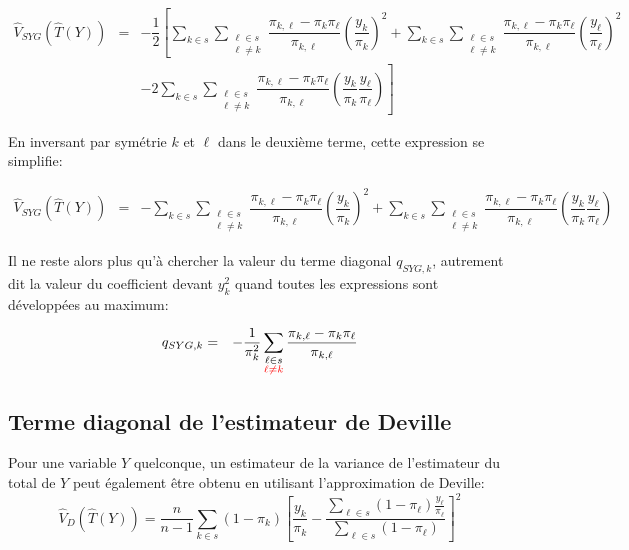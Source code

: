 \documentclass[a4paper,12pt]{article}
\begin{document}
\begin{eqnarray*}
\hat{V}_{SYG}(\hat{T}(Y)) &=& -\dfrac{1}{2} \left[ \sum \limits_{k \in s} \sum \limits_{\substack{\ell \in s \\ \ell \neq k}} \dfrac{\pi_{k,\ell} - \pi_k \pi_\ell}{\pi_{k,\ell}} \left(\dfrac{y_k}{\pi_k}\right)^2 + \sum \limits_{k \in s} \sum \limits_{\substack{\ell \in s \\ \ell \neq k}} \dfrac{\pi_{k,\ell} - \pi_k \pi_\ell}{\pi_{k,\ell}} \left(\dfrac{y_\ell}{\pi_\ell}\right)^2 \right. \\
&& \left. - 2 \sum \limits_{k \in s} \sum \limits_{\substack{\ell \in s \\ \ell \neq k}} \dfrac{\pi_{k,\ell} - \pi_k \pi_\ell}{\pi_{k,\ell}} \left( \dfrac{y_k}{\pi_k} \dfrac{y_\ell}{\pi_\ell}\right) \right]
\end{eqnarray*}

\bigskip En inversant par symétrie $k$ et $\ell$ dans le deuxième terme, cette expression se simplifie:

\begin{eqnarray*}
\hat{V}_{SYG}(\hat{T}(Y)) &=& - \sum \limits_{k \in s} \sum \limits_{\substack{\ell \in s \\ \ell \neq k}} \dfrac{\pi_{k,\ell} - \pi_k \pi_\ell}{\pi_{k,\ell}} \left(\dfrac{y_k}{\pi_k}\right)^2 + \sum \limits_{k \in s} \sum \limits_{\substack{\ell \in s \\ \ell \neq k}} \dfrac{\pi_{k,\ell} - \pi_k \pi_\ell}{\pi_{k,\ell}} \left( \dfrac{y_k}{\pi_k} \dfrac{y_\ell}{\pi_\ell}\right)
\end{eqnarray*}

\bigskip Il ne reste alors plus qu'à chercher la valeur du terme diagonal $q_{SYG,k}$, autrement dit la valeur du coefficient devant $y_k^2$ quand toutes les expressions sont développées au maximum:

\begin{eqnarray*}
q_{SYG,k} &=& - \dfrac{1}{\pi_k^2}\sum \limits_{\substack{\ell \in s \\ \textcolor{red}{\ell \neq k}}} \dfrac{\pi_{k,\ell} - \pi_k \pi_\ell}{\pi_{k,\ell}}
\end{eqnarray*}

\bigskip \subsection*{Terme diagonal de l'estimateur de Deville}

\bigskip Pour une variable $Y$ quelconque, un estimateur de la variance de l'estimateur du total de $Y$ peut également être obtenu en utilisant l'approximation de Deville: $$ \hat{V}_D(\hat{T}(Y)) = \dfrac{n}{n-1}\sum_{k \in s} ( 1 - \pi_k)\left[\dfrac{y_k}{\pi_k} - \dfrac{\sum_{\ell \in s} (1 - \pi_\ell) \frac{y_\ell}{\pi_\ell}}{\sum_{\ell \in s} (1 - \pi_\ell)}\right]^2 $$
\end{document}
